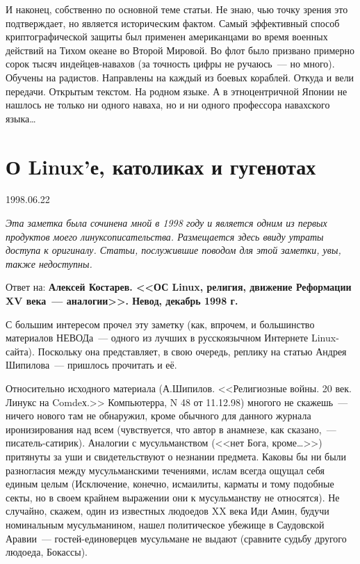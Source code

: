 И наконец, собственно по основной теме статьи. Не знаю, чью точку зрения это подтверждает, но является историческим фактом. Самый эффективный способ криптографической защиты был применен американцами во время военных действий на Тихом океане во Второй Мировой. Во флот было призвано примерно сорок тысяч индейцев-навахов (за точность цифры не ручаюсь~--- но много). Обучены на радистов. Направлены на каждый из боевых кораблей. Откуда и вели передачи. Открытым текстом. На родном языке. А в этноцентричной Японии не нашлось не только ни одного наваха, но и ни одного профессора навахского языка\dots 

\section{О Linux'е, католиках и гугенотах} 
\begin{timeline}1998.06.22\end{timeline}

\textsl{Эта заметка была сочинена мной в 1998 году и является одним из первых продуктов моего линуксописательства. Размещается здесь ввиду утраты доступа к оригиналу. Статьи, послужившие поводом для этой заметки, увы, также недоступны.}\medskip

Ответ на: \textbf{Алексей Костарев. <<ОС Linux, религия, движение Реформации XV века~--- аналогии>>. Невод, декабрь 1998 г.}

С большим интересом прочел эту заметку (как, впрочем, и большинство материалов НЕВОДа~--- одного из лучших в русскоязычном Интернете Linux-сайта). Поскольку она представляет, в свою очередь, реплику на статью Андрея Шипилова~--- пришлось прочитать и её. 

Относительно исходного материала (А.Шипилов. <<Религиозные войны. 20 век. Линукс на Comdeх.>> Компьютерра, N 48 от 11.12.98) многого не скажешь~--- ничего нового там не обнаружил, кроме обычного для данного журнала иронизирования над всем (чувствуется, что автор в анамнезе, как сказано,~--- писатель-сатирик). Аналогии с мусульманством (<<нет Бога, кроме\dots>>) притянуты за уши и свидетельствуют о незнании предмета. Каковы бы ни были разногласия между мусульманскими течениями, ислам всегда ощущал себя единым целым (Исключение, конечно, исмаилиты, карматы и тому подобные секты, но в своем крайнем выражении они к мусульманству не относятся). Не случайно, скажем, один из известных людоедов XX века Иди Амин, будучи номинальным мусульманином, нашел политическое убежище в Саудовской Аравии~--- гостей-единоверцев мусульмане не выдают (сравните судьбу другого людоеда, Бокассы).

